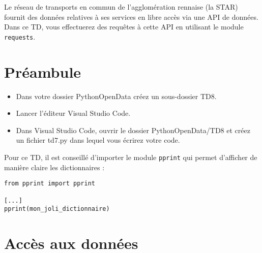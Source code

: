 \documentclass[11pt,a4paper]{article}
\begin{document}
Le réseau de transports en commun de l'agglomération rennaise (la STAR) fournit des données relatives à ses services en libre accès via une API de données.
Dans ce TD, vous effectuerez des requêtes à cette API en utilisant le module \verb+requests+.

\section*{Préambule}
\begin{itemize}
    \item Dans votre dossier PythonOpenData créez un sous-dossier TD8.
    \item Lancer l'éditeur Visual Studio Code.
    \item Dans Visual Studio Code, ouvrir le dossier PythonOpenData/TD8 et créez un fichier td7.py dans lequel vous écrirez votre code. 
\end{itemize}

Pour ce TD, il est conseillé d'importer le module \verb+pprint+ qui permet d'afficher de manière claire les dictionnaires :

\begin{verbatim}
from pprint import pprint

[...]
pprint(mon_joli_dictionnaire)
\end{verbatim}

\section{Accès aux données}
\end{document}
